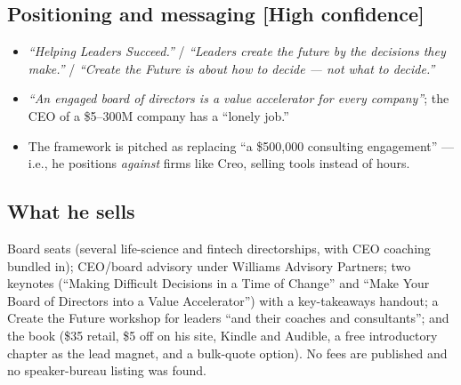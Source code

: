 \documentclass[11pt]{article}
\newcommand{\high}{\textcolor{green!45!black}{\textbf{[High confidence]}}}
\begin{document}
\subsection{Positioning and messaging \high}
\begin{itemize}
  \item \emph{``Helping Leaders Succeed.''} / \emph{``Leaders create the future by the
  decisions they make.''} / \emph{``Create the Future is about how to decide --- not what
  to decide.''}
  \item \emph{``An engaged board of directors is a value accelerator for every
  company''}; the CEO of a \$5--300M company has a ``lonely job.''
  \item The framework is pitched as replacing ``a \$500,000 consulting engagement'' ---
  i.e., he positions \emph{against} firms like Creo, selling tools instead of hours.
\end{itemize}

\subsection{What he sells}
Board seats (several life-science and fintech directorships, with CEO coaching bundled
in); CEO/board advisory under Williams Advisory Partners; two keynotes (``Making
Difficult Decisions in a Time of Change'' and ``Make Your Board of Directors into a
Value Accelerator'') with a key-takeaways handout; a Create the Future\textregistered{}
workshop for leaders ``and their coaches and consultants''; and the book (\$35 retail,
\$5 off on his site, Kindle and Audible, a free introductory chapter as the lead
magnet, and a bulk-quote option). No fees are published and no speaker-bureau listing
was found.
\end{document}

